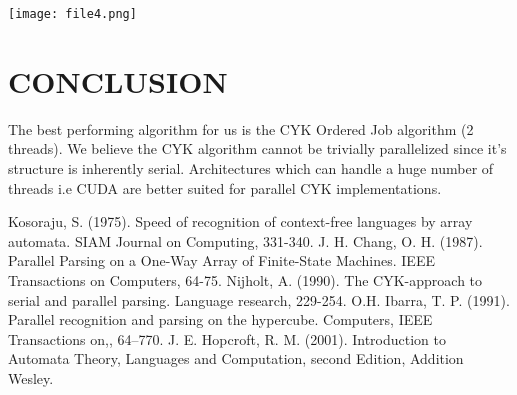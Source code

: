 \documentclass[12pt]{article}
\begin{document}
\texttt{[image: file4.png]}\\

\section{CONCLUSION}
The best performing algorithm for us is the CYK Ordered Job algorithm (2 threads). We believe the CYK algorithm cannot be trivially parallelized since it’s structure is inherently serial. Architectures which can handle a huge number of threads i.e CUDA are better suited for parallel CYK implementations. 


\vspace{70 mm}

\begin{thebibliography}{1}
 Kosoraju, S. (1975). Speed of recognition of context-free languages by array automata. SIAM Journal on Computing, 331-340.
 J. H. Chang, O. H. (1987). Parallel Parsing on a One-Way Array of Finite-State Machines. IEEE Transactions on Computers, 64-75.
 Nijholt, A. (1990). The CYK-approach to serial and parallel parsing. Language research, 229-254.
 O.H. Ibarra, T. P. (1991). Parallel recognition and parsing on the hypercube. Computers, IEEE Transactions on,, 64–770.
 J. E. Hopcroft, R. M. (2001). Introduction to Automata Theory, Languages and Computation, second Edition, Addition Wesley.
\end{thebibliography}
\end{document}
